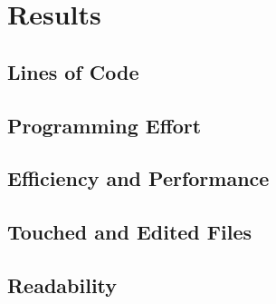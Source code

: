 \chapter{Results}

\section{Lines of Code}
\section{Programming Effort}
\section{Efficiency and Performance}
\section{Touched and Edited Files}
\section{Readability}